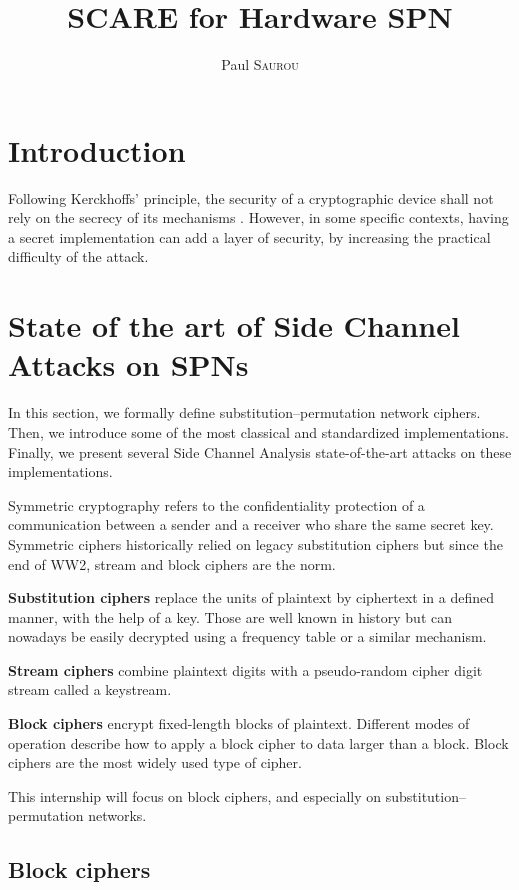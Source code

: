 \documentclass[11pt]{sdm}
\title{SCARE for Hardware SPN}
\author{Paul \textsc{Saurou}}
\begin{document}
\maketitle


\section*{Introduction}

Following Kerckhoffs' principle, the security of a cryptographic device shall not rely on the secrecy of its mechanisms \parencite{Kerckhoffs_1883}.
However, in some specific contexts, having a secret implementation can add a layer of security, by increasing the practical difficulty of the attack.

\section{State of the art of Side Channel Attacks on SPNs}

In this section, we formally define substitution–permutation network ciphers.
Then, we introduce some of the most classical and standardized implementations.
Finally, we present several Side Channel Analysis state-of-the-art attacks on these implementations.


Symmetric cryptography refers to the confidentiality protection of a communication between a sender and a receiver who share the same secret key.
Symmetric ciphers historically relied on legacy substitution ciphers but since the end of WW2, stream and block ciphers are the norm.

\textbf{Substitution ciphers} replace the units of plaintext by ciphertext in a defined manner, with the help of a key.
Those are well known in history but can nowadays be easily decrypted using a frequency table or a similar mechanism.

\textbf{Stream ciphers} combine plaintext digits with a pseudo-random cipher digit stream called a keystream.

\textbf{Block ciphers} encrypt fixed-length blocks of plaintext.
Different modes of operation describe how to apply a block cipher to data larger than a block.
Block ciphers are the most widely used type of cipher.

This internship will focus on block ciphers, and especially on substitution–permutation networks.

\subsection{Block ciphers}
\end{document}
